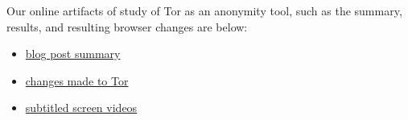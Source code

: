 \documentclass{template}
\begin{document}
Our online artifacts of study of Tor as an anonymity tool, such as 
the summary, results, and resulting browser changes are below:
\begin{itemize} \itemsep1pt \parskip0pt 
\item \href{https://trac.torproject.org/projects/tor/wiki/org/meetings/2015UXsprint}{blog post summary}
\item \href{https://blog.torproject.org/blog/ux-sprint-2015-wrapup}{changes made to Tor}
\item \href{https://people.torproject.org/~dcf/uxsprint2015/}{subtitled screen videos}
\end{itemize}


 
\end{document}
